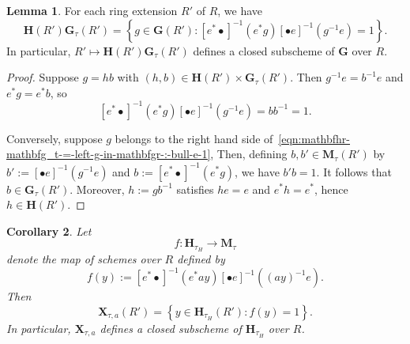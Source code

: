 \documentclass[reqno]{amsart}
\theoremstyle{plain} \newtheorem{theorem} {Theorem} \newtheorem{conjecture} {Conjecture} \newtheorem{corollary} [theorem] {Corollary} \newtheorem{proposition} [theorem] {Proposition} \newtheorem{fact} [theorem] {Fact}
\theoremstyle{definition} \newtheorem{definition} [theorem] {Definition}
\theoremstyle{itplain} %
\newtheorem{lemma}[theorem]{Lemma}
\begin{document}
\begin{lemma}\label{lemma:each-ring-extens-r-r-we-have-begin-mathbfhr-m}
  For each ring extension $R'$ of $R$, we have
  \begin{equation}\label{eqn:mathbfhr-mathbfg_t-=-left-g-in-mathbfgr-:-bull-e-1}
    \mathbf{H}(R') \mathbf{G}_\tau(R') =
    \left\{
      g \in \mathbf{G}(R') :
      {[e^* \bullet]}^{-1}( e^* g) {[\bullet e]}^{-1}(g^{-1} e)  = 1
    \right\}.
  \end{equation}
  In particular, $R' \mapsto \mathbf{H}(R') \mathbf{G}_\tau(R')$ defines a closed subscheme of $\mathbf{G}$ over $R$.
\end{lemma}
\begin{proof}
  Suppose $g = h b$ with $(h,b) \in \mathbf{H}(R') \times \mathbf{G}_\tau(R')$.  Then $g^{-1} e = b^{-1} e$ and $e^* g = e^* b$, so
  \begin{equation*} {[e^* \bullet]}^{-1}( e^* g) {[\bullet e]}^{-1}(g^{-1} e) = b b^{-1} = 1.
  \end{equation*}
  
  Conversely, suppose $g$ belongs to the right hand side of~\eqref{eqn:mathbfhr-mathbfg_t-=-left-g-in-mathbfgr-:-bull-e-1}, Then, defining $b, b' \in \mathbf{M}_{\tau}(R')$ by $b' := {[\bullet e]}^{-1}(g^{-1} e)$ and $b := {[e^* \bullet]}^{-1}(e^* g)$, we have $b' b = 1$.  It follows that $b \in \mathbf{G}_\tau(R')$.  Moreover, $h := g b^{-1}$ satisfies $h e = e$ and $e^* h = e^*$, hence $h \in \mathbf{H}(R')$.
\end{proof}
\begin{corollary}\label{corollary:let-begin-f-:-mathbfh_t-right-mathbfm_t-}
  Let
  \begin{equation*}
    f : \mathbf{H}_{\tau_H} \rightarrow \mathbf{M}_\tau
  \end{equation*}
  denote the map of schemes over $R$ defined by
  \begin{equation*}
    f(y) := {[e^* \bullet]}^{-1}( e^* a y) {[\bullet e]}^{-1}({(a y)}^{-1} e).
  \end{equation*}
  Then
  \begin{equation*}
    \mathbf{X}_{\tau, a}(R')
    =
    \left\{
      y \in \mathbf{H}_{\tau_H}(R') :
      f(y) = 1
    \right\}.
  \end{equation*}
  In particular, $\mathbf{X}_{\tau,a}$ defines a closed subscheme of $\mathbf{H}_{\tau_H}$ over $R$.
\end{corollary}
\end{document}
